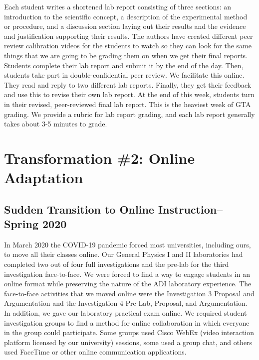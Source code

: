 \documentclass[aip, numerical, preprint]{revtex4-2}
\begin{document}
Each student writes a shortened lab report consisting of three sections: an introduction to the
scientific concept, a description of the experimental method or procedure, and a discussion
section laying out their results and the evidence and justification supporting their results.
The authors have created different peer review calibration videos for the students to watch so
they can look for the same things that we are going to be grading them on when we get their
final reports.  Students complete their lab report and submit it by the end of the day.  Then,
students take part in double-confidential peer review.  We facilitate this online.  They read
and reply to two different lab reports.  Finally, they get their feedback and use this to
revise their own lab report.  At the end of this week, students turn in their revised,
peer-reviewed final lab report.  This is the heaviest week of GTA grading.  We provide a rubric
for lab report grading, and each lab report generally takes about 3-5 minutes to grade.

\section{Transformation \#2: Online Adaptation}

\subsection{Sudden Transition to Online Instruction--Spring 2020}

In March 2020 the COVID-19 pandemic forced most universities, including ours, to move all their
classes online. Our General Physics I and II laboratories had completed two out of four full
investigations and the pre-lab for the third investigation face-to-face. We were forced to find
a way to engage students in an online format while preserving the nature of the ADI laboratory
experience. The face-to-face activities that we moved online were the Investigation 3 Proposal
and Argumentation and the Investigation 4 Pre-Lab, Proposal, and Argumentation. In addition, we
gave our laboratory practical exam online. We required student investigation groups to find a
method for online collaboration in which everyone in the group could participate. Some groups
used Cisco WebEx (video interaction platform licensed by our university) sessions, some used a
group chat, and others used FaceTime or other online communication applications.
\end{document}
